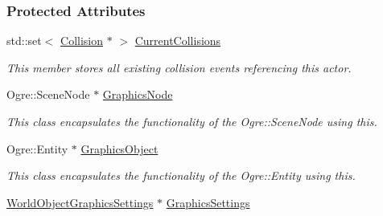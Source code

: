 \subsubsection*{Protected Attributes}
\begin{DoxyCompactItemize}
\item 
\hypertarget{classMezzanine_1_1WorldObject_a03ca27d9ad12263f76d3c854acbed912}{
std::set$<$ \hyperlink{classMezzanine_1_1Collision}{Collision} $\ast$ $>$ \hyperlink{classMezzanine_1_1WorldObject_a03ca27d9ad12263f76d3c854acbed912}{CurrentCollisions}}
\label{classMezzanine_1_1WorldObject_a03ca27d9ad12263f76d3c854acbed912}

\begin{DoxyCompactList}\small\item\em This member stores all existing collision events referencing this actor. \item\end{DoxyCompactList}\item 
\hypertarget{classMezzanine_1_1WorldObject_af9682da6de09a649bf5c7cef150124f5}{
Ogre::SceneNode $\ast$ \hyperlink{classMezzanine_1_1WorldObject_af9682da6de09a649bf5c7cef150124f5}{GraphicsNode}}
\label{classMezzanine_1_1WorldObject_af9682da6de09a649bf5c7cef150124f5}

\begin{DoxyCompactList}\small\item\em This class encapsulates the functionality of the Ogre::SceneNode using this. \item\end{DoxyCompactList}\item 
\hypertarget{classMezzanine_1_1WorldObject_a050053b525931b996a4b1759e7087ecf}{
Ogre::Entity $\ast$ \hyperlink{classMezzanine_1_1WorldObject_a050053b525931b996a4b1759e7087ecf}{GraphicsObject}}
\label{classMezzanine_1_1WorldObject_a050053b525931b996a4b1759e7087ecf}

\begin{DoxyCompactList}\small\item\em This class encapsulates the functionality of the Ogre::Entity using this. \item\end{DoxyCompactList}\item 
\hypertarget{classMezzanine_1_1WorldObject_ac8bd91e343ead1b486ae8348e1580369}{
\hyperlink{classMezzanine_1_1WorldObjectGraphicsSettings}{WorldObjectGraphicsSettings} $\ast$ \hyperlink{classMezzanine_1_1WorldObject_ac8bd91e343ead1b486ae8348e1580369}{GraphicsSettings}}
\label{classMezzanine_1_1WorldObject_ac8bd91e343ead1b486ae8348e1580369}


\end{DoxyCompactItemize}

